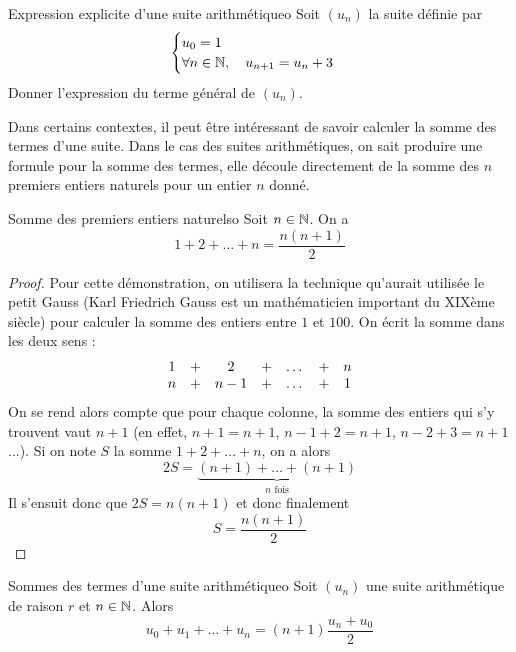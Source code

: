 \begin{exemple}{Expression explicite d'une suite arithmétique}{o}
	Soit $(u_n)$ la suite définie par \[\begin{cases}u_0=1\\\forall n\in\mathbb{N},\quad u_{n+1}=u_n+3\end{cases}\]
	Donner l'expression du terme général de $(u_n)$.
\end{exemple}
Dans certains contextes, il peut être intéressant de savoir calculer la somme des termes d'une suite. Dans le cas des suites arithmétiques, on sait produire une formule pour la somme des termes, elle découle directement de la somme des $n$ premiers entiers naturels pour un entier $n$ donné.

\begin{lemme}{Somme des premiers entiers naturels}{o}
Soit $n\in\mathbb{N}$. On a \[1+2+\dots+n=\frac{n(n+1)}2\]
\end{lemme}

\begin{proof}
Pour cette démonstration, on utilisera la technique qu'aurait utilisée le petit Gauss (Karl Friedrich Gauss est un mathématicien important du XIXème siècle) pour calculer la somme des entiers entre $1$ et $100$. On écrit la somme dans les deux sens : 
\[
\begin{array}{c c c c c c c}
	1 & + & 2 & + & \dots & + & n\\
	n & + & n-1 & + & \dots & + & 1
\end{array}
\]
On se rend alors compte que pour chaque colonne, la somme des entiers qui s'y trouvent vaut $n+1$ (en effet, $n + 1 = n+1$, $n-1+2=n+1$, $n-2+3=n+1$...). Si on note $S$ la somme $1+2+\dots+n$, on a alors \[2S=\underbrace{(n+1)+\dots+(n+1)}_{n\text{ fois}}\]
Il s'ensuit donc que $2S=n(n+1)$ et donc finalement \[S=\frac{n(n+1)}2\]
\end{proof}

\begin{proposition}{Sommes des termes d'une suite arithmétique}{o}
Soit $(u_n)$ une suite arithmétique de raison $r$ et $n\in\mathbb{N}$. Alors 
\[u_0+u_1+\dots+u_n=(n+1)\frac{u_n+u_0}2\]
\end{proposition}

